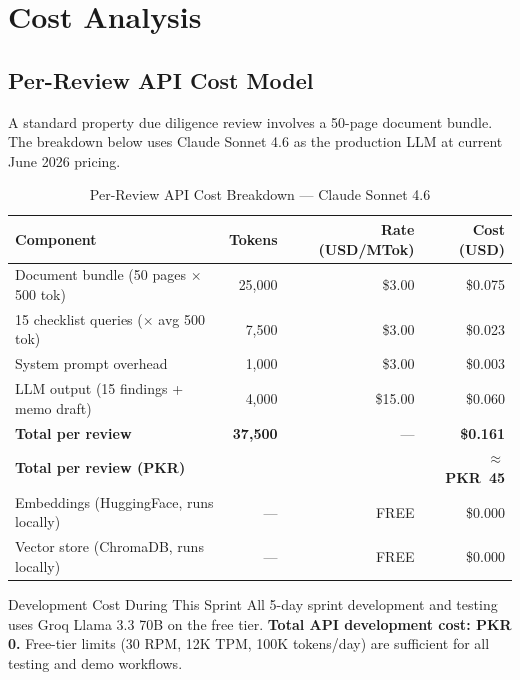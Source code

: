 \documentclass[12pt, a4paper]{article}
\begin{document}
\section{Cost Analysis}

\subsection{Per-Review API Cost Model}

A standard property due diligence review involves a 50-page document bundle.
The breakdown below uses Claude Sonnet 4.6 as the production LLM at current
June 2026 pricing.

\begin{table}[h]
\centering
\caption{Per-Review API Cost Breakdown --- Claude Sonnet 4.6}
\renewcommand{\arraystretch}{1.3}
\begin{tabularx}{\textwidth}{Xrrr}
\toprule
\textbf{Component} & \textbf{Tokens} & \textbf{Rate (USD/MTok)} & \textbf{Cost (USD)} \\
\midrule
Document bundle (50 pages $\times$ 500 tok)   & 25,000 & \$3.00  & \$0.075 \\
15 checklist queries ($\times$ avg 500 tok)   &  7,500 & \$3.00  & \$0.023 \\
System prompt overhead                         &  1,000 & \$3.00  & \$0.003 \\
LLM output (15 findings + memo draft)         &  4,000 & \$15.00 & \$0.060 \\
\midrule
\textbf{Total per review}                     & \textbf{37,500} & --- & \textbf{\$0.161} \\
\textbf{Total per review (PKR)}               &        &     & \textbf{$\approx$ PKR~45} \\
\midrule
Embeddings (HuggingFace, runs locally)        & ---    & FREE    & \$0.000 \\
Vector store (ChromaDB, runs locally)         & ---    & FREE    & \$0.000 \\
\bottomrule
\end{tabularx}
\label{tab:apicost}
\end{table}

\begin{calloutbox}{Development Cost During This Sprint}
All 5-day sprint development and testing uses Groq Llama 3.3 70B on the free
tier. \textbf{Total API development cost: PKR 0.} Free-tier limits (30 RPM,
12K TPM, 100K tokens/day) are sufficient for all testing and demo workflows.
\end{calloutbox}
\end{document}
